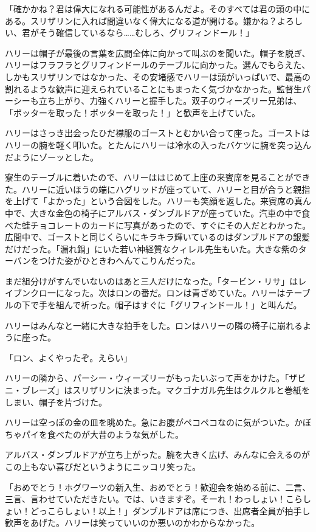 \documentclass[10pt,a4paper]{article}
\begin{document}
\begin{CJK}{UTF8}{min}
「確かかね？君は偉大になれる可能性があるんだよ。そのすべては君の頭の中にある。スリザリンに入れば間違いなく偉大になる道が開ける。嫌かね？よろしい、君がそう確信しているなら……むしろ、グリフィンドール！」

ハリーは帽子が最後の言葉を広間全体に向かって叫ぶのを聞いた。帽子を脱ぎ、ハリーはフラフラとグリフィンドールのテーブルに向かった。選んでもらえた、しかもスリザリンではなかった、その安堵感でハリーは頭がいっぱいで、最高の割れるような歓声に迎えられていることにもまったく気づかなかった。監督生パーシーも立ち上がり、力強くハリーと握手した。双子のウィーズリー兄弟は、「ポッターを取った！ポッターを取った！」と歓声を上げていた。

ハリーはさっき出会ったひだ襟服のゴーストとむかい合って座った。ゴーストはハリーの腕を軽く叩いた。とたんにハリーは冷水の入ったバケツに腕を突っ込んだようにゾーッとした。

寮生のテーブルに着いたので、ハリーははじめて上座の来賓席を見ることができた。ハリーに近いほうの端にハグリッドが座っていて、ハリーと目が合うと親指を上げて「よかった」という合図をした。ハリーも笑顔を返した。来賓席の真ん中で、大きな金色の椅子にアルバス・ダンブルドアが座っていた。汽車の中で食べた蛙チョコレートのカードに写真があったので、すぐにその人だとわかった。広間中で、ゴーストと同じくらいにキラキラ輝いているのはダンブルドアの銀髪だけだった。「漏れ鍋」にいた若い神経質なクィレル先生もいた。大きな紫のターバンをつけた姿がひときわへんてこりんだった。

まだ組分けがすんでいないのはあと三人だけになった。「タービン・リサ」はレイブンクロ一になった。次はロンの番だ。ロンは青ざめていた。ハリーはテーブルの下で手を組んで祈った。帽子はすぐに「グリフィンドール！」と叫んだ。

ハリーはみんなと一緒に大きな拍手をした。ロンはハリーの隣の椅子に崩れるように座った。

「ロン、よくやったぞ。えらい」

ハリーの隣から、パーシー・ウィーズリーがもったいぶって声をかけた。「ザビニ・ブレーズ」はスリザリンに決まった。マクゴナガル先生はクルクルと巻紙をしまい、帽子を片づけた。

ハリーは空っぽの金の皿を眺めた。急にお腹がペコペコなのに気がついた。かぼちゃパイを食べたのが大昔のような気がした。

アルバス・ダンブルドアが立ち上がった。腕を大きく広げ、みんなに会えるのがこの上もない喜びだというようにニッコリ笑った。

「おめでとう！ホグワーツの新入生、おめでとう！歓迎会を始める前に、二言、三言、言わせていただきたい。では、いきますぞ。そーれ！わっしょい！こらしょい！どっこらしょい！以上！」ダンブルドアは席につき、出席者全員が拍手し歓声をあげた。ハリーは笑っていいのか悪いのかわからなかった。


\end{CJK}
\end{document}

